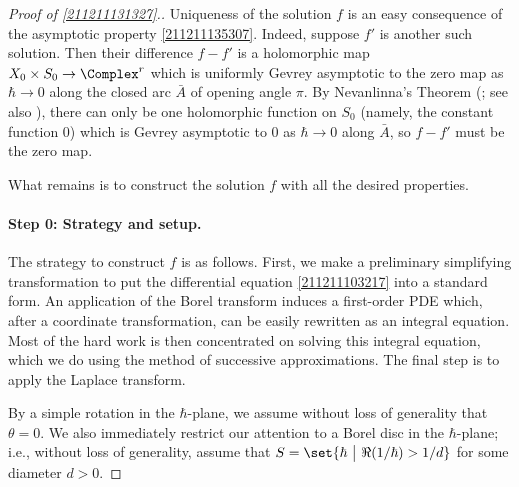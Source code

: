 \documentclass[11pt]{article}
\begin{document}
\begin{proof}[Proof of \autoref{211211131327}.]
Uniqueness of the solution $f$ is an easy consequence of the asymptotic property \eqref{211211135307}.
Indeed, suppose $f'$ is another such solution.
Then their difference $f - f'$ is a holomorphic map $X_0 \times S_0 \to \Complex^r$ which is uniformly Gevrey asymptotic to the zero map as $\hbar \to 0$ along the closed arc $\bar{A}$ of opening angle $\pi$.
By Nevanlinna's Theorem (\cite[pp.44-45]{nevanlinna1918theorie}; see also \cite[Theorem B.11]{MY2008.06492}), there can only be one holomorphic function on $S_0$ (namely, the constant function $0$) which is Gevrey asymptotic to $0$ as $\hbar \to 0$ along $\bar{A}$, so $f - f'$ must be the zero map.

What remains is to construct the solution $f$ with all the desired properties.



\paragraph*{Step 0: Strategy and setup.}
The strategy to construct $f$ is as follows.
First, we make a preliminary simplifying transformation to put the differential equation \eqref{211211103217} into a standard form.
An application of the Borel transform induces a first-order PDE which, after a coordinate transformation, can be easily rewritten as an integral equation.
Most of the hard work is then concentrated on solving this integral equation, which we do using the method of successive approximations.
The final step is to apply the Laplace transform.

By a simple rotation in the $\hbar$-plane, we assume without loss of generality that $\theta = 0$.
We also immediately restrict our attention to a Borel disc in the $\hbar$-plane; i.e., without loss of generality, assume that $S = \set{ \hbar ~\big|~ \Re (1/\hbar) > 1/ d}$ for some diameter $d > 0$.


\end{proof}
\end{document}
